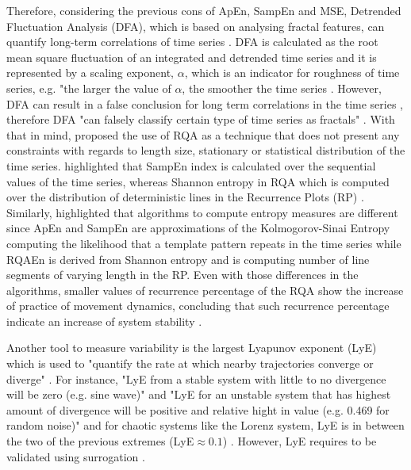 Therefore, considering the previous cons of ApEn, SampEn and MSE, Detrended 
Fluctuation Analysis (DFA), which is based on analysing fractal features, 
can quantify long-term correlations of time series \citep{peng1995}.
DFA is calculated as the root mean square fluctuation of an integrated 
and detrended time series and it is represented by a scaling exponent, 
$\alpha$, which is an indicator for roughness of time series,
e.g. "the larger the value of $\alpha$, the smoother the time series 
\citep[p. 83]{peng1995}.
However, DFA can result in a false conclusion for long term 
correlations in the time series \cite[p. 5001]{rangarajan2000}, therefore 
DFA "can falsely classify certain type of time series as fractals" 
\cite[p. 80]{wijnants2009}.
With that in mind, \cite{wijnants2009} proposed the use of RQA as a 
technique that does not present any constraints with regards to length size,
stationary or statistical distribution of the time series.
\cite{wijnants2009} highlighted that  SampEn index is calculated 
over the sequential values of the time series, whereas Shannon entropy in 
RQA which is computed over the distribution of deterministic lines in 
the Recurrence Plots (RP) \citep{marwan2008, trulla1996, zbilut1992}.
Similarly, \cite{rhea2011} highlighted that algorithms to compute entropy 
measures are different since ApEn and SampEn are approximations of the 
Kolmogorov-Sinai Entropy computing the likelihood that a template pattern 
repeats in the time series while RQAEn is derived from Shannon entropy 
and is computing number of line segments of varying length in the RP.
Even with those differences in the algorithms, smaller values of 
recurrence percentage of the RQA show the increase of practice of movement
dynamics, concluding that such recurrence percentage indicate an 
increase of system stability \citep{wijnants2009}.





Another tool to measure variability is the largest Lyapunov exponent (LyE) 
which is used to "quantify the rate at which nearby trajectories
converge or diverge" \citep[p. 85]{stergiou2016b}.
For instance, "LyE from a stable system with little to no divergence will 
be zero (e.g. sine wave)" and "LyE for an unstable system that has highest 
amount of divergence will be positive and relative hight in value
(e.g. 0.469 for random noise)" and for chaotic systems like the Lorenz system,
LyE is in between the two of the previous extremes (LyE$\approx0.1$) 
\cite[p. 2874]{miller2006}. However,  LyE requires to be validated using 
surrogation \citep{dingwell2000, miller2006}.


